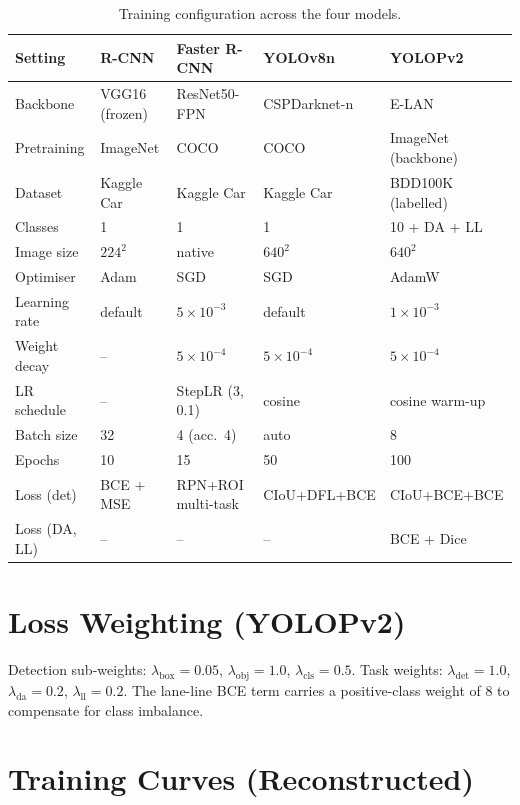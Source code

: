\documentclass[12pt,a4paper]{report}
\begin{document}
\begin{table}[H]
\centering
\caption{Training configuration across the four models.}
\label{tab:hparams}
\small
\begin{tabularx}{\textwidth}{@{}lXXXX@{}}
\toprule
\textbf{Setting} & \textbf{R-CNN} & \textbf{Faster R-CNN} & \textbf{YOLOv8n} & \textbf{YOLOPv2} \\
\midrule
Backbone        & VGG16 (frozen) & ResNet50-FPN & CSPDarknet-n & E-LAN \\
Pretraining     & ImageNet & COCO & COCO & ImageNet (backbone) \\
Dataset         & Kaggle Car & Kaggle Car & Kaggle Car & BDD100K (labelled) \\
Classes         & 1 & 1 & 1 & 10 + DA + LL \\
Image size      & $224^2$ & native & $640^2$ & $640^2$ \\
Optimiser       & Adam & SGD & SGD & AdamW \\
Learning rate   & default & $5\!\times\!10^{-3}$ & default & $1\!\times\!10^{-3}$ \\
Weight decay    & -- & $5\!\times\!10^{-4}$ & $5\!\times\!10^{-4}$ & $5\!\times\!10^{-4}$ \\
LR schedule     & -- & StepLR (3, 0.1) & cosine & cosine warm-up \\
Batch size      & 32 & 4 (acc.\ 4) & auto & 8 \\
Epochs          & 10 & 15 & 50 & 100 \\
Loss (det)      & BCE + MSE & RPN+ROI multi-task & CIoU+DFL+BCE & CIoU+BCE+BCE \\
Loss (DA, LL)   & -- & -- & -- & BCE + Dice \\
\bottomrule
\end{tabularx}
\end{table}

\section{Loss Weighting (YOLOPv2)}

Detection sub-weights: $\lambda_{\text{box}} = 0.05$, $\lambda_{\text{obj}} = 1.0$, $\lambda_{\text{cls}} = 0.5$. Task weights: $\lambda_{\text{det}} = 1.0$, $\lambda_{\text{da}} = 0.2$, $\lambda_{\text{ll}} = 0.2$. The lane-line BCE term carries a positive-class weight of $8$ to compensate for class imbalance.

\section{Training Curves (Reconstructed)}
\end{document}
